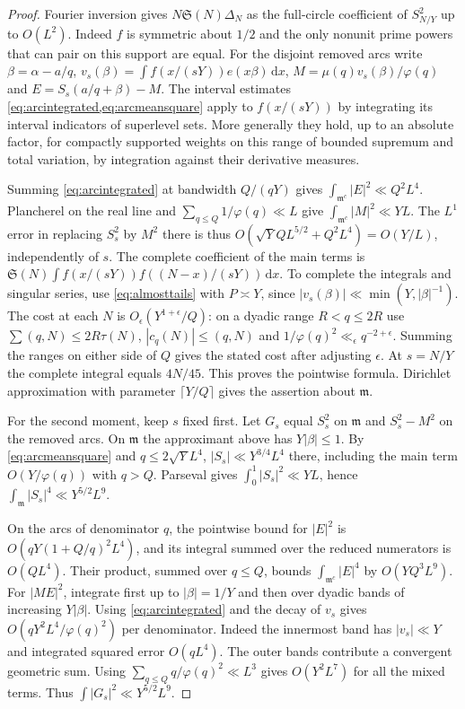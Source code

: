 \documentclass[11pt,a4paper]{article}
\numberwithin{equation}{section}
\newcommand{\SSS}{\mathfrak S}
\newcommand{\ud}{\mathrm d}
\begin{document}
\begin{proof}
Fourier inversion gives $N\SSS(N)\Delta_N$ as the full-circle
coefficient of $S_{N/Y}^2$ up to $O(L^2)$. Indeed $f$ is
symmetric about $1/2$ and the only nonunit prime powers that can
pair on this support are equal. For the disjoint removed arcs
write $\beta=\alpha-a/q$, $v_s(\beta)=\int f(x/(sY))e(x\beta)\,\ud x$,
$M=\mu(q)v_s(\beta)/\varphi(q)$ and $E=S_s(a/q+\beta)-M$.
The interval estimates \cref{eq:arcintegrated,eq:arcmeansquare}
apply to $f(x/(sY))$ by integrating its interval indicators of
superlevel sets. More generally they hold, up to an absolute
factor, for compactly supported weights on this range of bounded
supremum and total variation, by integration against their
derivative measures.

Summing \cref{eq:arcintegrated} at bandwidth $Q/(qY)$ gives
$\int_{\mathfrak m^c}|E|^2\ll Q^2L^4$. Plancherel on the real
line and $\sum_{q\le Q}1/\varphi(q)\ll L$ give
$\int_{\mathfrak m^c}|M|^2\ll YL$. The $L^1$ error in replacing
$S_s^2$ by $M^2$ there is thus
$O(\sqrt Y QL^{5/2}+Q^2L^4)=O(Y/L)$, independently of $s$.
The complete coefficient of the main terms is
$\SSS(N)\int f(x/(sY))f((N-x)/(sY))\,\ud x$. To complete the
integrals and singular series, use \cref{eq:almosttails} with
$P\asymp Y$, since $|v_s(\beta)|\ll\min(Y,|\beta|^{-1})$.
The cost at each $N$ is $O_\epsilon(Y^{1+\epsilon}/Q)$:
on a dyadic range $R<q\le2R$ use
$\sum(q,N)\le2R\tau(N)$, $|c_q(N)|\le(q,N)$ and
$1/\varphi(q)^2\ll_\epsilon q^{-2+\epsilon}$.
Summing the ranges on either side of $Q$ gives the stated cost
after adjusting $\epsilon$. At $s=N/Y$ the complete integral
equals $4N/45$. This proves the pointwise formula. Dirichlet
approximation with parameter $\lceil Y/Q\rceil$ gives the
assertion about $\mathfrak m$.

For the second moment, keep $s$ fixed first. Let $G_s$ equal
$S_s^2$ on $\mathfrak m$ and $S_s^2-M^2$ on the removed arcs.
On $\mathfrak m$ the approximant above has $Y|\beta|\le1$.
By \cref{eq:arcmeansquare} and $q\le2\sqrt Y L^4$,
$|S_s|\ll Y^{3/4}L^4$ there, including the main term
$O(Y/\varphi(q))$ with $q>Q$. Parseval gives
$\int_0^1|S_s|^2\ll YL$, hence
$\int_{\mathfrak m}|S_s|^4\ll Y^{5/2}L^9$.

On the arcs of denominator $q$, the pointwise bound for
$|E|^2$ is $O(qY(1+Q/q)^2L^4)$, and its integral summed over
the reduced numerators is $O(QL^4)$. Their product, summed over
$q\le Q$, bounds $\int_{\mathfrak m^c}|E|^4$ by $O(YQ^3L^9)$.
For $|ME|^2$, integrate first up to $|\beta|=1/Y$ and then over
dyadic bands of increasing $Y|\beta|$. Using
\cref{eq:arcintegrated} and the decay of $v_s$ gives
$O(qY^2L^4/\varphi(q)^2)$ per denominator. Indeed the innermost
band has $|v_s|\ll Y$ and integrated squared error $O(qL^4)$.
The outer bands contribute a convergent geometric sum.
Using $\sum_{q\le Q}q/\varphi(q)^2\ll L^3$ gives $O(Y^2L^7)$
for all the mixed terms. Thus $\int |G_s|^2\ll Y^{5/2}L^9$.


\end{proof}
\end{document}
